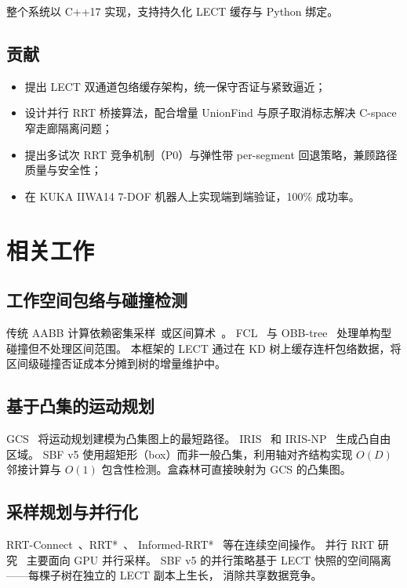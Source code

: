 \documentclass[11pt,a4paper]{article}
\begin{document}
整个系统以 C++17 实现，支持持久化 LECT 缓存与 Python 绑定。

\subsection{贡献}

\begin{itemize}[nosep]
  \item 提出 LECT 双通道包络缓存架构，统一保守否证与紧致逼近；
  \item 设计并行 RRT 桥接算法，配合增量 UnionFind 与原子取消标志解决 C-space 窄走廊隔离问题；
  \item 提出多试次 RRT 竞争机制（P0）与弹性带 per-segment 回退策略，兼顾路径质量与安全性；
  \item 在 KUKA IIWA14 7-DOF 机器人上实现端到端验证，100\% 成功率。
\end{itemize}

\section{相关工作}
\label{sec:related}

\subsection{工作空间包络与碰撞检测}

传统 AABB 计算依赖密集采样~\cite{caflisch1998monte}或区间算术~\cite{moore2009introduction}。
FCL~\cite{pan2012fcl} 与 OBB-tree~\cite{gottschalk1996obbtree} 处理单构型碰撞但不处理区间范围。
本框架的 LECT 通过在 KD 树上缓存连杆包络数据，将区间级碰撞否证成本分摊到树的增量维护中。

\subsection{基于凸集的运动规划}

GCS~\cite{marcucci2023motion} 将运动规划建模为凸集图上的最短路径。
IRIS~\cite{deits2015computing} 和 IRIS-NP~\cite{werner2024fast} 生成凸自由区域。
SBF v5 使用超矩形（box）而非一般凸集，利用轴对齐结构实现 $O(D)$ 邻接计算与
$O(1)$ 包含性检测。盒森林可直接映射为 GCS 的凸集图。

\subsection{采样规划与并行化}

RRT-Connect~\cite{kuffner2000rrt}、RRT*~\cite{karaman2011sampling}、
Informed-RRT*~\cite{gammell2014informed} 等在连续空间操作。
并行 RRT 研究~\cite{bialkowski2011massively} 主要面向 GPU 并行采样。
SBF v5 的并行策略基于 LECT 快照的空间隔离——每棵子树在独立的 LECT 副本上生长，
消除共享数据竞争。
\end{document}
